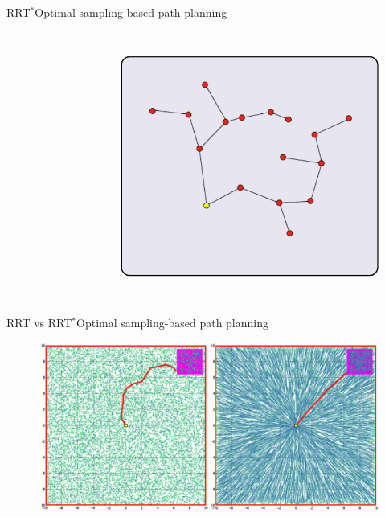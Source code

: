\begin{frame}{RRT$^{*}$}{Optimal sampling-based path planning}
\begin{columns}
\begin{figure}
		\label{fig:rrts:07}
	\end{figure}
	\begin{figure}
		\centering
		\includegraphics[width=\linewidth]{figure/RRTs08.png}
		\label{fig:rrts:08}
	\end{figure}
\end{columns}
\end{frame}

\begin{frame}{RRT vs RRT$^{*}$}{Optimal sampling-based path planning}
	\begin{figure}
		\centering
		\includegraphics[width=.8\linewidth]{figure/RRT_RRTs.png}
		\label{fig:rrt:result}
	\end{figure}
\end{frame}
